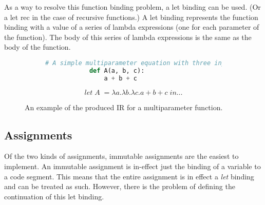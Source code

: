 \documentclass{l4proj}
\begin{document}
As a way to resolve this function binding problem, a let binding can be used. (Or a let rec in the case of recursive functions.)
A let binding represents the function binding with a value of a series of lambda expressions (one for each parameter of the function).
The body of this series of lambda expressions is the same as the body of the function.

\begin{figure}[H]
    \begin{subfigure}{0.45\textwidth}
        \begin{center}
            \begin{lstlisting}[language=Python, keepspaces=true]
            # A simple multiparameter equation with three inputs.
            def A(a, b, c):
                a + b + c
            \end{lstlisting}
        \end{center}
    \end{subfigure}
    \begin{subfigure}{0.45\textwidth}
        \begin{center}
            \begin{equation*}
                let \; A \; = \lambda a . \lambda b. \lambda c. a + b + c \; in \dots
            \end{equation*}
        \end{center}
    \end{subfigure}
    \caption{An example of the produced IR for a multiparameter function.}
    \label{fig:function-to-ir}
\end{figure}


\subsection*{Assignments}

Of the two kinds of assignments, immutable assignments are the easiest to implement.
An immutable assignment is in-effect just the binding of a variable to a code segment.
This means that the entire assignment is in effect a \emph{let} binding and can be treated as such.
However, there is the problem of defining the continuation of this let binding.
\end{document}
